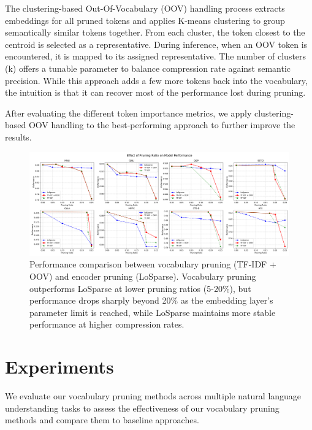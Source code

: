 \documentclass[twocolumn]{article}
\begin{document}
The clustering-based Out-Of-Vocabulary (OOV) handling process extracts embeddings for all pruned tokens and applies K-means clustering to group semantically similar tokens together. From each cluster, the token closest to the centroid is selected as a representative. During inference, when an OOV token is encountered, it is mapped to its assigned representative.
The number of clusters (k) offers a tunable parameter to balance compression rate against semantic precision. While this approach adds a few more tokens back into the vocabulary, the intuition is that it can recover most of the performance lost during pruning.


After evaluating the different token importance metrics, we apply clustering-based OOV handling to the best-performing approach to further improve the results.

\begin{figure}[t]
    \centering
    \includegraphics[width=\linewidth]{images/pruning_ratios.png}
    \caption{Performance comparison between vocabulary pruning (TF-IDF + OOV) and encoder pruning (LoSparse). Vocabulary pruning outperforms LoSparse at lower pruning ratios (5-20\%), but performance drops sharply beyond 20\% as the embedding layer's parameter limit is reached, while LoSparse maintains more stable performance at higher compression rates.}
    \label{fig:pruning_ratio}
\end{figure}

\section{Experiments}
We evaluate our vocabulary pruning methods across multiple natural language understanding tasks to assess the effectiveness of our vocabulary pruning methods and compare them to baseline approaches.
\end{document}
